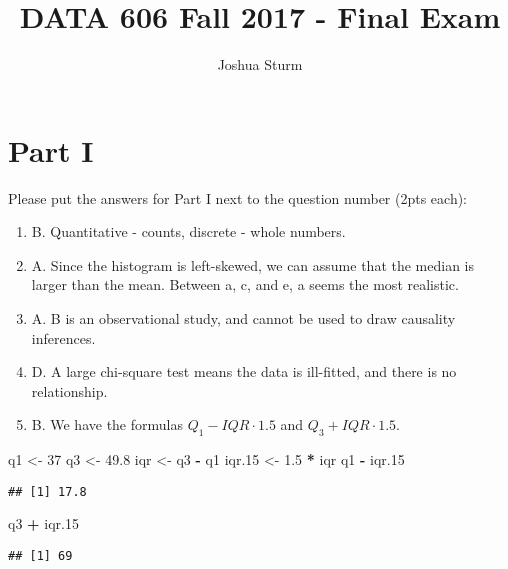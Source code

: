 \documentclass[]{article}
\title{DATA 606 Fall 2017 - Final Exam}
\author{Joshua Sturm}
\date{}
\newenvironment{Shaded}{\begin{snugshade}}{\end{snugshade}}
\newcommand{\DecValTok}[1]{\textcolor[rgb]{0.00,0.00,0.81}{#1}}
\newcommand{\FloatTok}[1]{\textcolor[rgb]{0.00,0.00,0.81}{#1}}
\newcommand{\StringTok}[1]{\textcolor[rgb]{0.31,0.60,0.02}{#1}}
\newcommand{\OperatorTok}[1]{\textcolor[rgb]{0.81,0.36,0.00}{\textbf{#1}}}
\newcommand{\NormalTok}[1]{#1}
\providecommand{\tightlist}{%
  \setlength{\itemsep}{0pt}\setlength{\parskip}{0pt}}
\begin{document}
\maketitle

\section{Part I}\label{part-i}

Please put the answers for Part I next to the question number (2pts
each):

\begin{enumerate}
\def\labelenumi{\arabic{enumi}.}
\tightlist
\item
  B. Quantitative - counts, discrete - whole numbers.
\item
  A. Since the histogram is left-skewed, we can assume that the median
  is larger than the mean. Between a, c, and e, a seems the most
  realistic.
\item
  A. B is an observational study, and cannot be used to draw causality
  inferences.
\item
  D. A large chi-square test means the data is ill-fitted, and there is
  no relationship.
\item
  B. We have the formulas \(Q_1 - IQR\cdot1.5\) and
  \(Q_3 + IQR\cdot1.5\).
\end{enumerate}

\begin{Shaded}
\begin{Highlighting}[]
\NormalTok{q1 <-}\StringTok{ }\DecValTok{37}
\NormalTok{q3 <-}\StringTok{ }\FloatTok{49.8}
\NormalTok{iqr <-}\StringTok{ }\NormalTok{q3 }\OperatorTok{-}\StringTok{ }\NormalTok{q1}
\NormalTok{iqr.}\DecValTok{15}\NormalTok{ <-}\StringTok{ }\FloatTok{1.5} \OperatorTok{*}\StringTok{ }\NormalTok{iqr}
\NormalTok{q1 }\OperatorTok{-}\StringTok{ }\NormalTok{iqr.}\DecValTok{15}
\end{Highlighting}
\end{Shaded}

\begin{verbatim}
## [1] 17.8
\end{verbatim}

\begin{Shaded}
\begin{Highlighting}[]
\NormalTok{q3 }\OperatorTok{+}\StringTok{ }\NormalTok{iqr.}\DecValTok{15}
\end{Highlighting}
\end{Shaded}

\begin{verbatim}
## [1] 69
\end{verbatim}
\end{document}
